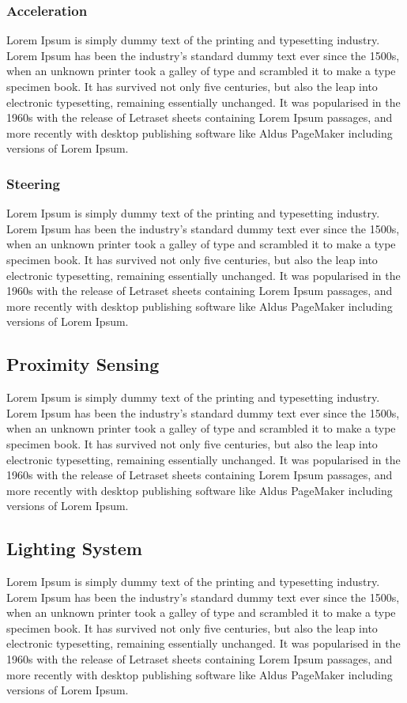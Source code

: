 \subsubsection{Acceleration}
Lorem Ipsum is simply dummy text of the printing and typesetting industry. Lorem Ipsum has been the industry's standard dummy text ever since the 1500s, when an unknown printer took a galley of type and scrambled it to make a type specimen book. It has survived not only five centuries, but also the leap into electronic typesetting, remaining essentially unchanged. It was popularised in the 1960s with the release of Letraset sheets containing Lorem Ipsum passages, and more recently with desktop publishing software like Aldus PageMaker including versions of Lorem Ipsum.

\subsubsection{Steering}
Lorem Ipsum is simply dummy text of the printing and typesetting industry. Lorem Ipsum has been the industry's standard dummy text ever since the 1500s, when an unknown printer took a galley of type and scrambled it to make a type specimen book. It has survived not only five centuries, but also the leap into electronic typesetting, remaining essentially unchanged. It was popularised in the 1960s with the release of Letraset sheets containing Lorem Ipsum passages, and more recently with desktop publishing software like Aldus PageMaker including versions of Lorem Ipsum.

\subsection{Proximity Sensing}
Lorem Ipsum is simply dummy text of the printing and typesetting industry. Lorem Ipsum has been the industry's standard dummy text ever since the 1500s, when an unknown printer took a galley of type and scrambled it to make a type specimen book. It has survived not only five centuries, but also the leap into electronic typesetting, remaining essentially unchanged. It was popularised in the 1960s with the release of Letraset sheets containing Lorem Ipsum passages, and more recently with desktop publishing software like Aldus PageMaker including versions of Lorem Ipsum.

\subsection{Lighting System}
Lorem Ipsum is simply dummy text of the printing and typesetting industry. Lorem Ipsum has been the industry's standard dummy text ever since the 1500s, when an unknown printer took a galley of type and scrambled it to make a type specimen book. It has survived not only five centuries, but also the leap into electronic typesetting, remaining essentially unchanged. It was popularised in the 1960s with the release of Letraset sheets containing Lorem Ipsum passages, and more recently with desktop publishing software like Aldus PageMaker including versions of Lorem Ipsum.

